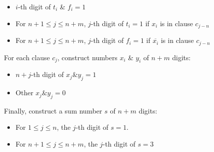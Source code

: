 \documentclass[10pt,landscape,a4paper]{article}
\begin{document}
\begin{multicols*}{3}
\begin{itemize}
    \item $i$-th digit of $t_i$ \& $f_i = 1$
    \item For $n + 1 \leq j \leq n + m$, $j$-th digit of $t_i = 1$ if $x_i$ is in clause $c_{j-n}$
    \item For $n + 1 \leq j \leq n + m$, $j$-th digit of $f_i = 1$ if $\overline{x_i}$ is in clause $c_{j-n}$
\end{itemize}

For each clause $c_j$, construct numbers $x_i$ \& $y_i$ of $n + m$ digits:

\begin{itemize}
    \item $n+j$-th digit of $x_j \& y_j = 1$
    \item Other $x_j \& y_j = 0$
\end{itemize}

Finally, construct a sum number $s$ of $n + m$ digits:

\begin{itemize}
    \item For $1 \leq j \leq n$, the $j$-th digit of $s = 1$.
    \item For $n + 1 \leq j \leq n + m$, the $j$-th digit of $s = 3$
\end{itemize}






\end{multicols*}
\end{document}

